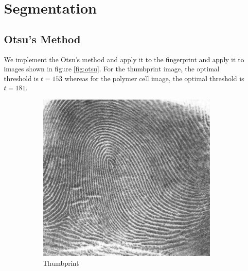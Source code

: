 \documentclass[]{article}
\begin{document}
\section{Segmentation}
\subsection{Otsu's Method}
We implement the Otsu's method and apply it to the fingerprint and apply it to images shown in figure \ref{fig:otsu}. For the thumbprint image, the optimal threshold is $t=153$ whereas for the polymer cell image, the optimal threshold is $t=181$.
\begin{figure}[H]
    \centering
    \begin{subfigure}{0.25\textwidth}
        \centering
        \includegraphics[width=\textwidth]{img/before/thumbprint}
        \caption{Thumbprint}
    \end{subfigure}%
    ~
    \begin{subfigure}{0.25\textwidth}
        \centering

\end{subfigure}
\end{figure}
\end{document}

